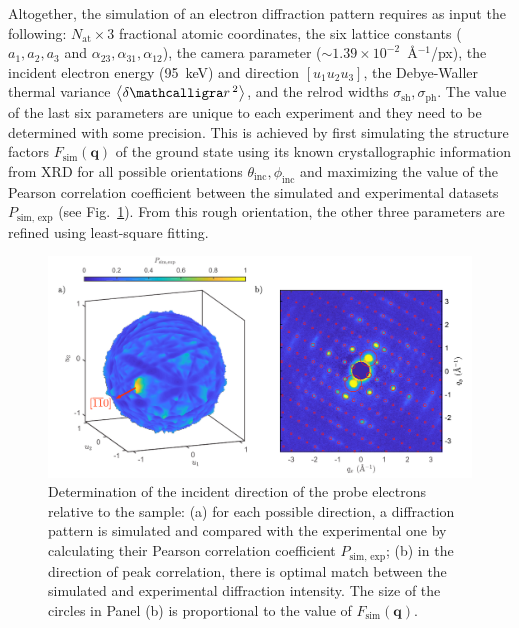 Altogether, the simulation of an electron diffraction pattern requires as input the following:
$N_\text{at} \times 3$ fractional atomic coordinates, the six lattice constants
($a_1, a_2, a_3$ and $\alpha_{23}, \alpha_{31}, \alpha_{12}$),
the camera parameter (${\sim}1.39 \times 10^{-2}$~\AA$^{-1}$/px),
the incident electron energy (95~keV) and direction $[u_1 u_2 u_3]$,
the Debye-Waller thermal variance $\left< \delta \scriptr^2 \right>$, and
the relrod widths $\sigma_\text{sh}, \sigma_\text{ph}$.
%
The value of the last six parameters are unique to each experiment and
they need to be determined with some precision.
%
This is achieved by first simulating the structure factors $F_\text{sim}(\boldsymbol{q})$
of the ground state using its known crystallographic information from XRD
for all possible orientations $\theta_\text{inc}, \phi_\text{inc}$
and maximizing the value of the Pearson correlation coefficient between the simulated
and experimental datasets $P_\text{sim, exp}$ (see Fig.~\ref{fig: UED-orientation}).
From this rough orientation, the other three parameters are refined using least-square fitting.

\begin{figure}[t!]
  \centering
  \includegraphics[width = \textwidth]{Figures/fig_UED_orientation.pdf}
  \caption[Determination of the incident direction of the probe electrons relative to the sample.]{
  Determination of the incident direction of the probe electrons relative to the sample:
  (a) for each possible direction, a diffraction pattern is simulated and compared with
  the experimental one by calculating their Pearson correlation coefficient $P_\text{sim, exp}$;
  (b) in the direction of peak correlation, there is optimal match between the simulated
  and experimental diffraction intensity. The size of the circles in Panel (b) is proportional to
  the value of $F_\text{sim}(\boldsymbol{q})$.
  }
  \label{fig: UED-orientation}
\end{figure}

